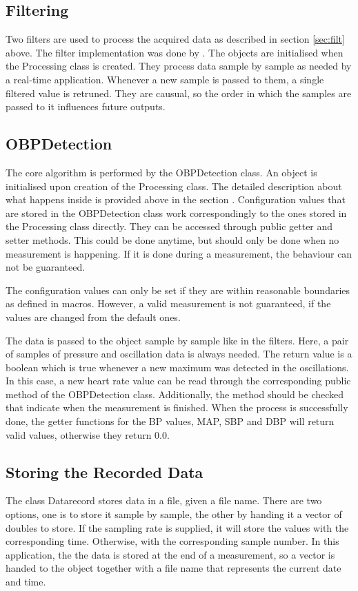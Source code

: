 \subsection{Filtering}
Two filters are used to process the acquired data as described in section \ref{sec:filt} above. The filter implementation was done by \citet{Porr2020iir}. The objects are initialised when the Processing class is created. They process data sample by sample as needed by a real-time application. Whenever a new sample is passed to them, a single filtered value is retruned. They are causual, so the order in which the samples are passed to it influences future outputs.


\subsection{OBPDetection}
The core algorithm is performed by the OBPDetection class. An object is initialised upon creation of the Processing class. The detailed description about what happens inside is provided above in the section . Configuration values that are stored in the OBPDetection class work correspondingly to the ones stored in the Processing class directly. They can be accessed through public getter and setter methods. This could be done anytime, but should only be done when no measurement is happening. If it is done during a measurement, the behaviour can not be guaranteed. 

The configuration values can only be set if they are within reasonable boundaries as defined in macros. However, a valid measurement is not guaranteed, if the values are changed from the default ones.

The data is passed to the object sample by sample like in the filters. Here, a pair of samples of pressure and oscillation data is always needed. The return value is a boolean which is true whenever a new maximum was detected in the oscillations. In this case, a new heart rate value can be read through the corresponding public method of the OBPDetection class. Additionally, the method should be checked that indicate when the measurement is finished. When the process is successfully done, the getter functions for the BP values, MAP, SBP and DBP will return valid values, otherwise they return $0.0$.

\subsection{Storing the Recorded Data}
The class Datarecord stores data in a file, given a file name. There are two options, one is to store it sample by sample, the other by handing it a vector of doubles to store. If the sampling rate is supplied, it will store the values with the corresponding time. Otherwise, with the corresponding sample number. In this application, the the data is stored at the end of a measurement, so a vector is handed to the object together with a file name that represents the current date and time. 



